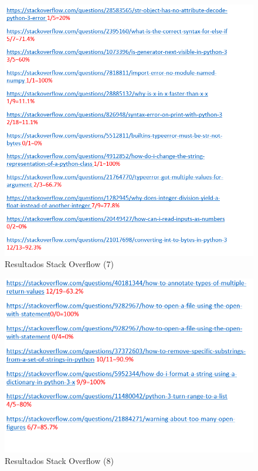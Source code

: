 \documentclass[a4paper, 12pt]{book}
\begin{document}
\begin{figure}
	\centering
    \includegraphics[width=1\textwidth]{img/stack11}
    \caption{Resultados Stack Overflow (7)}
 \end{figure}
 
\begin{figure}
	\centering
    \includegraphics[width=1\textwidth]{img/stack12}
    \caption{Resultados Stack Overflow (8)}
 \end{figure}
 
\end{document}
